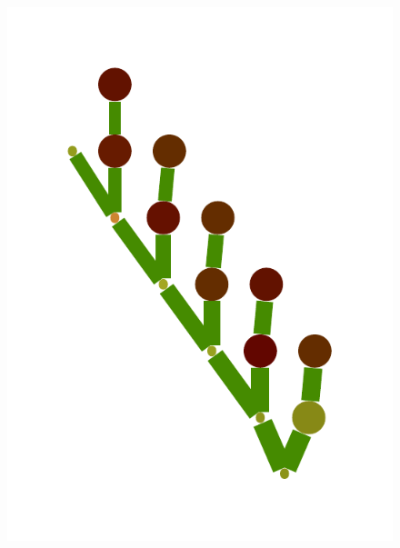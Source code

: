 \documentclass[a4paper,10pt]{article}
\begin{document}
\begin{figure}
{    \includegraphics[scale=.14]{./figures/6-4-vine-induced-6.pdf}
}
\end{figure}
\end{document}
